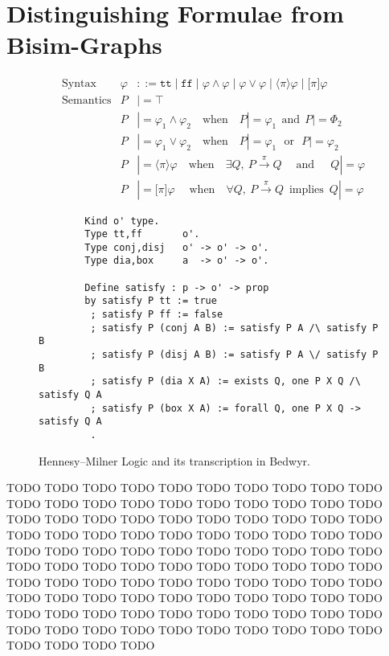 \documentclass{llncs}
\begin{document}
\section{Distinguishing Formulae from Bisim-Graphs}\label{sec:ccsdf}

\begin{figure}
\begin{align*}
&\text{Syntax} &
\varphi & ::= \texttt{tt} \mid \texttt{ff}
    \mid \varphi \land \varphi \mid \varphi \lor \varphi
    \mid \langle\pi\rangle \varphi \mid \lbrack\pi\rbrack \varphi
\\
&\text{Semantics} &
  P & |= \top \\&&
  P & |= \varphi_1 \land \varphi_2 \quad\text{when}\quad P |= \varphi_1 ~~\text{and}~~ P |= \varPhi_2 \\&&
  P & |= \varphi_1 \lor \varphi_2 \quad\text{when}\quad P |= \varphi_1 ~~~\text{or}~~~ P |= \varphi_2 \\&&
  P & |= \langle \pi \rangle \varphi \quad\text{when}\quad \exists Q,~ P\xrightarrow{\pi} Q \;\quad\text{and}\quad\;\, Q |= \varphi \\&&
  P & |= \lbrack \pi \rbrack \varphi \;\quad\text{when}\quad \forall Q,~ P\xrightarrow{\pi} Q ~\;\text{implies}~\; Q |= \varphi
\end{align*}
\vspace*{-3ex}
\begin{verbatim}
        Kind o' type.
        Type tt,ff       o'.
        Type conj,disj   o' -> o' -> o'.
        Type dia,box     a  -> o' -> o'.

        Define satisfy : p -> o' -> prop
        by satisfy P tt := true
         ; satisfy P ff := false
         ; satisfy P (conj A B) := satisfy P A /\ satisfy P B
         ; satisfy P (disj A B) := satisfy P A \/ satisfy P B
         ; satisfy P (dia X A) := exists Q, one P X Q /\ satisfy Q A
         ; satisfy P (box X A) := forall Q, one P X Q -> satisfy Q A
         .
\end{verbatim}
\vspace*{-2ex}
\caption{Hennesy--Milner Logic and its transcription in Bedwyr.}
  \label{TODO}
\end{figure}

TODO TODO TODO TODO TODO TODO TODO TODO TODO TODO TODO TODO TODO
TODO TODO TODO TODO TODO TODO TODO TODO TODO TODO TODO TODO TODO
TODO TODO TODO TODO TODO TODO TODO TODO TODO TODO TODO TODO TODO
TODO TODO TODO TODO TODO TODO TODO TODO TODO TODO TODO TODO TODO
TODO TODO TODO TODO TODO TODO TODO TODO TODO TODO TODO TODO TODO
TODO TODO TODO TODO TODO TODO TODO TODO TODO TODO TODO TODO TODO
TODO TODO TODO TODO TODO TODO TODO TODO TODO TODO TODO TODO TODO
TODO TODO TODO TODO TODO TODO TODO TODO TODO TODO TODO TODO TODO
\end{document}
